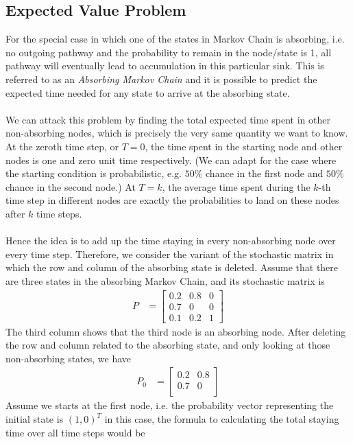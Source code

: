 \subsection{Expected Value Problem}
For the special case in which one of the states in Markov Chain is absorbing, i.e. no outgoing pathway and the probability to remain in the node/state is 1, all pathway will eventually lead to accumulation in this particular sink. This is referred to as an \textit{Absorbing Markov Chain} and it is possible to predict the expected time needed for any state to arrive at the absorbing state.\\
\\
We can attack this problem by finding the total expected time spent in other non-absorbing nodes, which is precisely the very same quantity we want to know. At the zeroth time step, or $T=0$, the time spent in the starting node and other nodes is one and zero unit time respectively. (We can adapt for the case where the starting condition is probabilistic, e.g. $50\%$ chance in the first node and $50\%$ chance in the second node.) At $T=k$, the average time spent during the $k$-th time step in different nodes are exactly the probabilities to land on these nodes after $k$ time steps.\\
\\
Hence the idea is to add up the time staying in every non-absorbing node over every time step. Therefore, we consider the variant of the stochastic matrix in which the row and column of the absorbing state is deleted. Assume that there are three states in the absorbing Markov Chain, and its stochastic matrix is
\begin{align*}
P &= 
\begin{bmatrix}
0.2 & 0.8 & 0\\
0.7 & 0 & 0 \\
0.1 & 0.2 & 1
\end{bmatrix}
\end{align*}
The third column shows that the third node is an absorbing node. After deleting the row and column related to the absorbing state, and only looking at those non-absorbing states, we have
\begin{align*}
P_0 &= 
\begin{bmatrix}
0.2 & 0.8\\
0.7 & 0 \\
\end{bmatrix}   
\end{align*}
Assume we starts at the first node, i.e. the probability vector representing the initial state is $(1, 0)^T$ in this case, the formula to calculating the total staying time over all time steps would be
